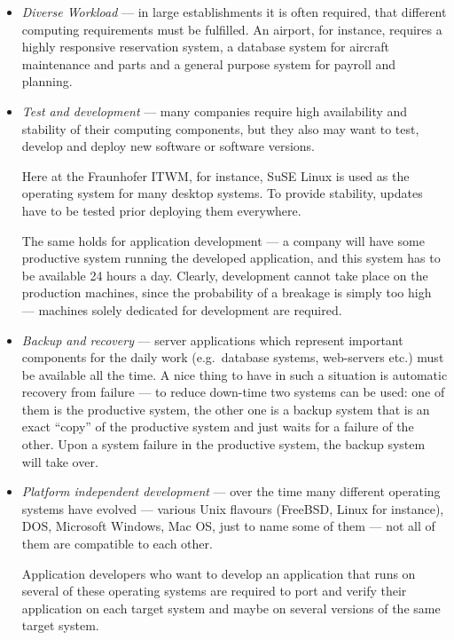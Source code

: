 \begin{itemize}
\item  \emph{Diverse Workload}  --- in  large establishments  it  is often
  required, that  different computing  requirements must be  fulfilled. An
  airport, for instance, requires  a highly responsive reservation system,
  a  database system  for aircraft  maintenance  and parts  and a  general
  purpose system for payroll and planning.
\item  \emph{Test  and  development}   ---  many  companies  require  high
  availability and stability of  their computing components, but they also
  may want to test, develop  and deploy new software or software versions.
  
  Here at  the Fraunhofer ITWM,  for instance, SuSE  Linux is used  as the
  operating system for many desktop systems. To provide stability, updates
  have to be tested prior deploying them everywhere.

  The same holds for application  development --- a company will have some
  productive system running the developed application, and this system has
  to be available  24 hours a day. Clearly,  development cannot take place
  on  the production  machines, since  the  probability of  a breakage  is
  simply  too  high ---  machines  solely  dedicated  for development  are
  required.
\item \emph{Backup  and recovery} --- server  applications which represent
  important  components   for  the  daily   work  (e.g.~database  systems,
  web-servers etc.) must  be available all the time. A  nice thing to have
  in such  a situation  is automatic recovery  from failure ---  to reduce
  down-time two systems can be used: one of them is the productive system,
  the  other one  is a  backup system  that is  an exact  ``copy''  of the
  productive system  and just waits  for a failure  of the other.   Upon a
  system failure  in the  productive system, the  backup system  will take
  over.
\item  \emph{Platform  independent development}  ---  over  the time  many
  different  operating  systems have  evolved  ---  various Unix  flavours
  (FreeBSD, Linux for  instance), DOS, Microsoft Windows, Mac  OS, just to
  name some of them --- not all of them are compatible to each other.

  Application developers who  want to develop an application  that runs on
  several of these operating systems are required to port and verify their
  application on each  target system and maybe on  several versions of the
  same target system.


\end{itemize}
